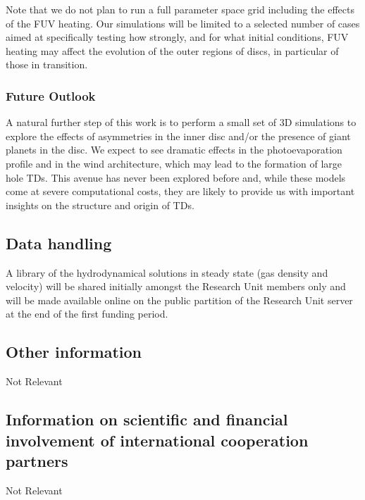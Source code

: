 \documentclass[10pt,fleqn,twoside]{article}
\newcommand{\Tcol}{\color{blue}}
\begin{document}
Note that we do not plan to run a full
parameter space grid including the effects of the FUV heating. 
Our simulations will be limited to a selected number of cases
aimed at specifically testing how strongly, and for what initial
conditions, FUV heating may affect the evolution of the outer regions
of discs, in particular of those in transition.\\

\subsubsection{Future Outlook}

A natural further step of this work is to perform a small set of 3D
simulations to explore the effects of asymmetries in the inner
disc and/or the presence of giant planets in the disc. We expect to
see dramatic effects in the photoevaporation 
profile and in the wind architecture, which may lead to the formation
of large hole TDs. This avenue has never been explored before and,
while these models come at severe computational costs, they are likely to provide us
with important insights on the structure and origin of TDs. \\ 



\subsection{\Tcol Data handling}

A library of the hydrodynamical solutions in steady state (gas density
and velocity)  will be shared initially amongst the Research Unit
members only and will be made available online on the public partition
of the Research Unit server at the end of the first funding period. 

\subsection{\Tcol Other information}

Not Relevant

\subsection{\Tcol Information on scientific and financial involvement of international cooperation partners}

Not Relevant
\end{document}
